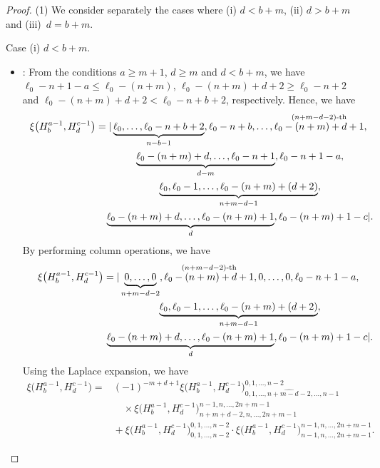 \documentclass[10pt,a4paper]{amsart}
\numberwithin{equation}{section}
\begin{document}
\begin{proof} (1) We consider separately the cases where (i) $d<b+m$, (ii) $d>b+m$ and (iii)~${d=b\!+\!m}$.

Case (i) $d<b+m$.
\begin{itemize}
\item {}: From the conditions $a\geq m+1$, $d\geq m$ and $d<b+m$, we have $\ell_{0}-n+1-a\leq \ell_{0}-(n+m)$, $\ell_{0}-(n+m)+d+2\geq \ell_{0}-n+2$ and $\ell_{0}-(n+m)+d+2 <\ell_{0}-n+b+2$, respectively. Hence, we have
\begin{gather*}
\xi\bigl(H^{a-1}_{b}, H^{c-1}_{d}\bigr)=|\underbrace{\ell_{0},\dots,\ell_{0}-n+b+2}_{n-b-1},\ell_{0}-n+b,\dots, \stackrel{(n+m-d-2)\text{-th}}{\ell_{0}-(n+m)+d+1},\nonumber\\
\hphantom{\xi\bigl(H^{a-1}_{b}, H^{c-1}_{d}\bigr)=|}{}
\underbrace{\ell_{0}-(n+m)+d,\dots,\ell_0-n+1}_{d-m},\ell_{0}-n+1-a,\nonumber\\
\hphantom{\xi\bigl(H^{a-1}_{b}, H^{c-1}_{d}\bigr)=|}{}
\underbrace{\ell_{0},\ell_{0}-1,\dots,\ell_{0}-(n+m)+(d+2)}_{n+m-d-1},\nonumber\\
\hphantom{\xi\bigl(H^{a-1}_{b}, H^{c-1}_{d}\bigr)=|}{}
\underbrace{\ell_{0}-(n+m)+d,\dots,\ell_{0}-(n+m)+1}_{d},\ell_{0}-(n+m)+1-c|.
\end{gather*}
By performing column operations, we have
\begin{gather*}
\xi\bigl(H^{a-1}_{b}, H^{c-1}_{d}\bigr)=|\underbrace{0,\dots,0}_{n+m-d-2},\stackrel{(n+m-d-2)\text{-th}}{\ell_{0}-(n+m)+d+1},0, \dots,0,\ell_{0}-n+1-a,\nonumber\\
\hphantom{\xi\bigl(H^{a-1}_{b}, H^{c-1}_{d}\bigr)=|}{}
\underbrace{\ell_{0},\ell_{0}-1,\dots,\ell_{0}-(n+m)+(d+2)}_{n+m-d-1},\nonumber\\
\hphantom{\xi\bigl(H^{a-1}_{b}, H^{c-1}_{d}\bigr)=|}{}
\underbrace{\ell_{0}-(n+m)+d,\dots,\ell_{0}-(n+m)+1}_{d},\ell_{0}-(n+m)+1-c|.
\end{gather*}
Using the Laplace expansion, we have
\begin{align*}
\xi\bigl(H^{a-1}_{b}, H^{c-1}_{d}\bigr)={}&
{(-1)}^{-m+d+1}\xi\bigl(H^{a-1}_{b}, H^{c-1}_{d}\bigr)^{0,1,\dots,n-2}_{0,1,\dots,\widehat{n+m-d-2},\dots,n-1}\\
&\quad{}\times\xi\bigl(H^{a-1}_{b}, H^{c-1}_{d}\bigr)^{n-1,n,\dots,2n+m-1}_{n+m+d-2,n,\dots,2n+m-1}\\
&{}+\xi\bigl(H^{a-1}_{b}, H^{c-1}_{d}\bigr)^{0,1,\dots,n-2}_{0,1,\dots,n-2}\cdot\xi\bigl(H^{a-1}_{b}, H^{c-1}_{d}\bigr)^{n-1,n,\dots,2n+m-1}_{n-1,n,\dots,2n+m-1}.
\end{align*}



\end{itemize}
\end{proof}
\end{document}

